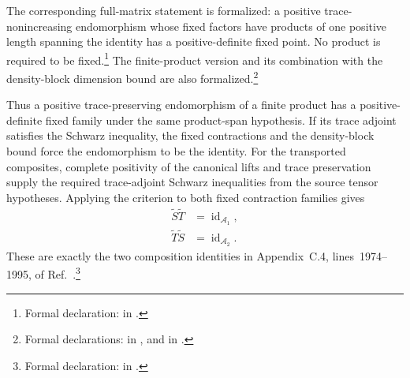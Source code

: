 \documentclass{article}
\begin{document}
The corresponding full-matrix statement is formalized: a positive
trace-nonincreasing endomorphism whose fixed factors have products of one
positive length spanning the identity has a positive-definite fixed point. No
product is required to be fixed.\footnote{Formal declaration:
in .}
The finite-product version and its combination with the density-block
dimension bound are also formalized.\footnote{Formal declarations:
in , and
in .}

Thus a positive trace-preserving endomorphism of a finite product has a
positive-definite fixed family under the same product-span hypothesis. If its
trace adjoint satisfies the Schwarz inequality, the fixed contractions and
the density-block bound force the endomorphism to be the identity. For the
transported composites, complete positivity of the canonical lifts and trace
preservation supply the required trace-adjoint Schwarz inequalities from the
source tensor hypotheses. Applying the criterion to both fixed contraction
families gives
\begin{align}
    \widetilde S\widetilde T
        &= \operatorname{id}_{\mathcal A_1},
    \label{eq:cpsv16_vertical_sector_invertibility_first_composite_identity}\\
    \widetilde T\widetilde S
        &= \operatorname{id}_{\mathcal A_2}.
    \label{eq:cpsv16_vertical_sector_invertibility_second_composite_identity}
\end{align}
These are exactly the two composition identities in Appendix~C.4,
lines~1974--1995, of Ref.~\cite{Cirac2016MPDO_arXiv}.\footnote{Formal
declaration:
in .}
\end{document}
